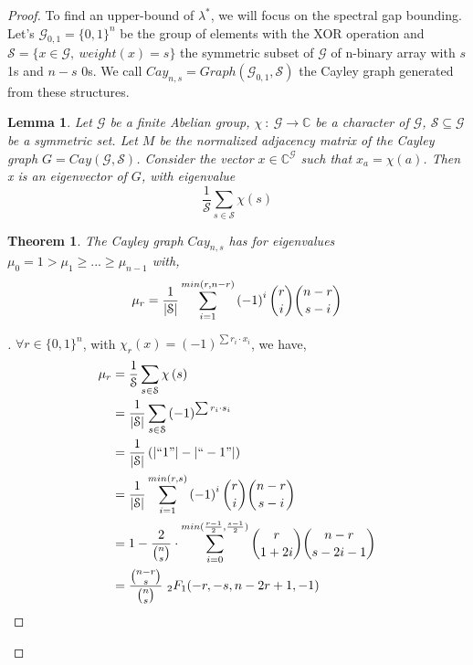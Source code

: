 \documentclass[USenglish,oneside,twocolumn]{article}
\newtheorem{lemma}{Lemma}
\newtheorem{theorem}{Theorem}
\newenvironment{subproof}[1][\proofname]{%
  \renewcommand{\qedsymbol}{$\blacksquare$}%
  \begin{proof}[#1]%
}{%
  \end{proof}%
}
\begin{document}
\begin{proof}
To find an upper-bound of $\lambda^*$, we will focus on the spectral gap bounding.
Let's $\mathcal{G}_{0,1}=\{0,1\}^n$ be the group of elements with the XOR operation and $\mathcal{S}=\{x \in \mathcal{G},\ weight(x)=s\}$ the symmetric subset of $\mathcal{G}$ of n-binary array with $s$ 1s and $n-s$ 0s.
We call $Cay_{n,s}=Graph\left(  \mathcal{G}_{0,1}, \mathcal{S} \right) $ the Cayley graph generated from these structures.

\begin{lemma}
Let $\mathcal{G}$ be a finite Abelian group, $\chi\ :\  \mathcal{G} \rightarrow \mathbb{C}$ be a character of $\mathcal{G}$, $\mathcal{S} \subseteq \mathcal{G}$ be a symmetric set.
Let $M$ be the normalized adjacency matrix of the Cayley graph $G = Cay(\mathcal{G},\mathcal{S})$.
Consider the vector $x \in \mathbb{C}^\mathcal{G}$ such that $x_a = \chi(a)$. Then x is an eigenvector of $G$, with eigenvalue $$ \frac{1}{\mathcal{S}} \sum_{s\in \mathcal{S}} \chi\left(s\right)$$
\end{lemma}

\begin{theorem}
The Cayley graph $Cay_{n,s}$ has for eigenvalues $\mu_0 = 1 > \mu_1 \geq ... \geq \mu_{n-1}$ with, 
$$\mu_r = \frac{1}{\left | \mathcal{S} \right |} \sum_{i=1}^{min(r, n-r)} \left ( -1 \right )^i {r \choose i}{n-r \choose s-i}\\$$
\end{theorem}

\begin{subproof}
$\forall r \in \{0,1\}^n$, with $\chi_r(x)=\left ( -1 \right )^{\sum r_i \cdot x_i}$, we have,
\begin{align*}
\mu_r &= \frac{1}{\mathcal{S}} \sum_{s\in \mathcal{S}} \chi\left(s\right) \\
&= \frac{1}{\left | \mathcal{S} \right |} \sum_{s\in \mathcal{S}} \left ( -1 \right )^{\sum r_i \cdot s_i} \\
&=  \frac{1}{\left | \mathcal{S} \right |} \left ( \left | ``1" \right | - \left | ``-1"  \right| \right ) \\
&= \frac{1}{\left | \mathcal{S} \right |} \sum_{i=1}^{min(r, s)} \left ( -1 \right )^i {r \choose i}{n-r \choose s-i} \\
&= 1 - \frac{2}{{n \choose s}} \cdot \sum_{i=0}^{min(\frac{r-1}{2}, \frac{s-1}{2})} {r \choose 1+2i}{n-r \choose s-2i-1} \\
&= \frac{{n-r \choose s}}{{n \choose s}} \ _2F_1(-r,-s,n-2r+1,-1)
\end{align*}
\end{subproof}



\end{proof}
\end{document}
